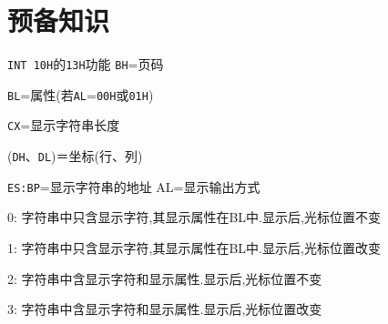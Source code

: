 \documentclass[11pt]{SEU-Digital-Report}
\begin{document}
\section{预备知识}
\begin{note}{\texttt{INT 10H}的\texttt{13H}功能}{}
    \texttt{BH}=页码

    \texttt{BL}=属性(若\texttt{AL}=\texttt{00H}或\texttt{01H})

    \texttt{CX}=显示字符串长度

    (\texttt{DH}、\texttt{DL})＝坐标(行、列)

    \texttt{ES:BP}=显示字符串的地址 AL=显示输出方式

    0: 字符串中只含显示字符,其显示属性在BL中.显示后,光标位置不变

    1: 字符串中只含显示字符,其显示属性在BL中.显示后,光标位置改变

    2: 字符串中含显示字符和显示属性.显示后,光标位置不变

    3: 字符串中含显示字符和显示属性.显示后,光标位置改变
\end{note}
\end{document}
